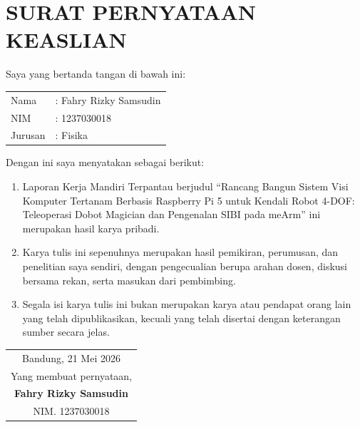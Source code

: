 \chapter*{\centering SURAT PERNYATAAN KEASLIAN}

\vspace{0.5cm}
\noindent Saya yang bertanda tangan di bawah ini:

\vspace{0.3cm}
\begin{center}
\begin{tabular}{ll}
Nama    & : Fahry Rizky Samsudin \\
NIM     & : 1237030018 \\
Jurusan & : Fisika \\
\end{tabular}
\end{center}

\vspace{0.5cm}
\noindent Dengan ini saya menyatakan sebagai berikut:
\begin{enumerate}[label=\arabic*.]
    \item Laporan Kerja Mandiri Terpantau berjudul ``Rancang Bangun Sistem Visi Komputer Tertanam Berbasis Raspberry Pi 5 untuk Kendali Robot 4-DOF: Teleoperasi Dobot Magician dan Pengenalan SIBI pada meArm'' ini merupakan hasil karya pribadi.
    \item Karya tulis ini sepenuhnya merupakan hasil pemikiran, perumusan, dan penelitian saya sendiri, dengan pengecualian berupa arahan dosen, diskusi bersama rekan, serta masukan dari pembimbing.
    \item Segala isi karya tulis ini bukan merupakan karya atau pendapat orang lain yang telah dipublikasikan, kecuali yang telah disertai dengan keterangan sumber secara jelas.
\end{enumerate}

\vspace{2cm}
\begin{flushright}
\begin{tabular}{c}
Bandung, 21 Mei 2026\\
Yang membuat pernyataan,\\[2.5cm]
\textbf{Fahry Rizky Samsudin}\\
NIM. 1237030018
\end{tabular}
\end{flushright}
\newpage

